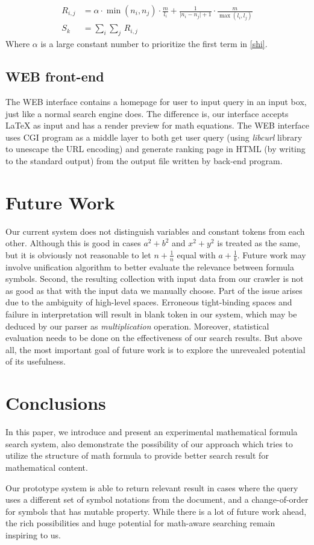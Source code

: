 \documentclass{acm_proc_article-sp}
\begin{document}
\begin{align}
\label{shi}
R_{i,j} &= \alpha \cdot \min(n_i, n_j) \cdot \frac{m}{l_i} + \frac{1}{\lvert n_i - n_j \rvert + 1} \cdot \frac{m}{\max(l_i, l_j)} \\
S_k &= \sum_{i}\sum_{j}\,R_{i,j}
\end{align}
Where $\alpha$ is a large constant number to prioritize the first term in \eqref{shi}.

\subsection{WEB front-end}
The WEB interface contains a homepage for user to input query in an input box, just like a normal search engine does. The difference is, our interface accepts \LaTeX{} as input and has a render preview for math equations. The WEB interface uses CGI program as a middle layer to both get user query (using \textit{libcurl} library to unescape the URL encoding) and generate ranking page in HTML (by writing to the standard output) from the output file written by back-end program.

\section{Future Work}
Our current system does not distinguish variables and constant tokens from each other. Although this is good in cases $a^2 + b^2$ and $x^2 + y^2$ is treated as the same, but it is obviously not reasonable to let $n+\frac{1}{n}$ equal with $a+\frac{1}{b}$. Future work may involve unification algorithm\cite{Baader} to better evaluate the relevance between formula symbols. Second, the resulting collection with input data from our crawler is not as good as that with the input data we manually choose. Part of the issue arises due to the ambiguity of high-level spaces\cite{Richard}. Erroneous tight-binding spaces and failure in interpretation will result in blank token in our system, which may be deduced by our parser as \textit{multiplication} operation. Moreover, statistical evaluation needs to be done on the effectiveness of our search results. But above all, the most important goal of future work is to explore the unrevealed potential of its usefulness.

\section{Conclusions}
In this paper, we introduce and present an experimental mathematical formula search system, also demonstrate the possibility of our approach which tries to utilize the structure of math formula to provide better search result for mathematical content. 

Our prototype system is able to return relevant result in cases where the query uses a different set of symbol notations from the document, and a change-of-order for symbols that has mutable property. While there is a lot of future work ahead, the rich possibilities and huge potential for math-aware searching remain inspiring to us.


\end{document}
